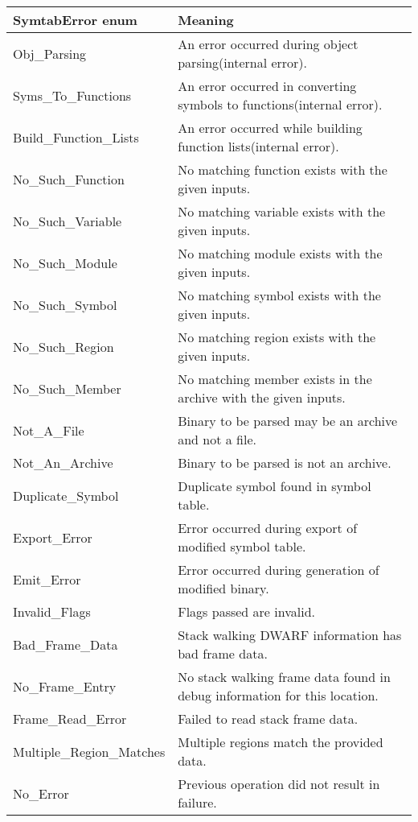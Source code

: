 \begin{center}
    \begin{tabular}{ll}
        \toprule
        SymtabError enum& Meaning\\
        \midrule
     Obj\_Parsing & An error occurred during object parsing(internal error).\\
     Syms\_To\_Functions & An error occurred in converting symbols to functions(internal error).\\
     Build\_Function\_Lists & An error occurred while building function lists(internal error).\\
     No\_Such\_Function & No matching function exists with the given inputs.\\
     No\_Such\_Variable & No matching variable exists with the given inputs.\\
     No\_Such\_Module & No matching module exists with the given inputs.\\
     No\_Such\_Symbol & No matching symbol exists with the given inputs.\\
     No\_Such\_Region & No matching region exists with the given inputs.\\
     No\_Such\_Member & No matching member exists in the archive with the given inputs.\\
     Not\_A\_File & Binary to be parsed may be an archive and not a file.\\
     Not\_An\_Archive & Binary to be parsed is not an archive.\\
     Duplicate\_Symbol & Duplicate symbol found in symbol table.\\
     Export\_Error & Error occurred during export of modified symbol table. \\
     Emit\_Error & Error occurred during generation of modified binary. \\
     Invalid\_Flags & Flags passed are invalid.\\
     Bad\_Frame\_Data & Stack walking DWARF information has bad frame data.\\
     No\_Frame\_Entry & No stack walking frame data found in debug information for this location.\\
     Frame\_Read\_Error & Failed to read stack frame data.\\
     Multiple\_Region\_Matches & Multiple regions match the provided data. \\ 
     No\_Error & Previous operation did not result in failure.\\
     \bottomrule
 \end{tabular}
 \end{center}

